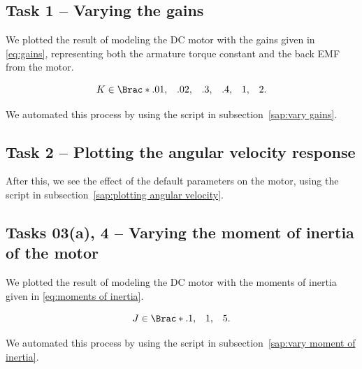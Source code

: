 \documentclass[12pt]{article}
\DeclarePairedDelimiter\Brac\{\}%
\begin{document}




\subsection{Task 1 -- Varying the gains}

We plotted the result of modeling the DC motor with the gains given in \eqref{eq:gains}, representing both the armature torque constant and the back EMF from the motor.

\begin{equation}\label{eq:gains}
    K \in \Brac*{\begin{matrix}.01, & .02, & .3, & .4, & 1, & 2\end{matrix}}.
\end{equation}

We automated this process by using the script in  subsection~\ref{sap:vary gains}.

\subsection{Task 2 -- Plotting the angular velocity response}

After this, we see the effect of the default parameters on the motor, using the script in  subsection~\ref{sap:plotting angular velocity}.

\subsection{Tasks 03(a), 4 -- Varying the moment of inertia of the motor}

We plotted the result of modeling the DC motor with the moments of inertia given in \eqref{eq:moments of inertia}.

\begin{equation}\label{eq:moments of inertia}
    J \in \Brac*{\begin{matrix}.1, & 1, & 5\end{matrix}}.
\end{equation}

We automated this process by using the script in  subsection~\ref{sap:vary moment of inertia}.
\end{document}
